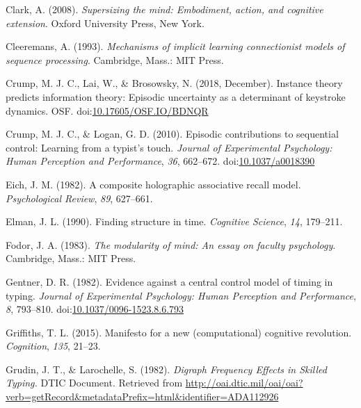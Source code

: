 \documentclass[,man,floatsintext]{apa6}
\begin{document}
\leavevmode\hypertarget{ref-clark_supersizing_2008}{}%
Clark, A. (2008). \emph{Supersizing the mind: Embodiment, action, and cognitive extension}. Oxford University Press, New York.

\leavevmode\hypertarget{ref-cleeremans_mechanisms_1993}{}%
Cleeremans, A. (1993). \emph{Mechanisms of implicit learning connectionist models of sequence processing}. Cambridge, Mass.: MIT Press.

\leavevmode\hypertarget{ref-Crump_Lai_Brosowsky_2018}{}%
Crump, M. J. C., Lai, W., \& Brosowsky, N. (2018, December). Instance theory predicts information theory: Episodic uncertainty as a determinant of keystroke dynamics. OSF. doi:\href{https://doi.org/10.17605/OSF.IO/BDNQR}{10.17605/OSF.IO/BDNQR}

\leavevmode\hypertarget{ref-crump_episodic_2010}{}%
Crump, M. J. C., \& Logan, G. D. (2010). Episodic contributions to sequential control: Learning from a typist's touch. \emph{Journal of Experimental Psychology: Human Perception and Performance}, \emph{36}, 662--672. doi:\href{https://doi.org/10.1037/a0018390}{10.1037/a0018390}

\leavevmode\hypertarget{ref-eich_composite_1982}{}%
Eich, J. M. (1982). A composite holographic associative recall model. \emph{Psychological Review}, \emph{89}, 627--661.

\leavevmode\hypertarget{ref-elman_finding_1990}{}%
Elman, J. L. (1990). Finding structure in time. \emph{Cognitive Science}, \emph{14}, 179--211.

\leavevmode\hypertarget{ref-fodor_modularity_1983}{}%
Fodor, J. A. (1983). \emph{The modularity of mind: An essay on faculty psychology}. Cambridge, Mass.: MIT Press.

\leavevmode\hypertarget{ref-GentnerEvidencecentralcontrol1982}{}%
Gentner, D. R. (1982). Evidence against a central control model of timing in typing. \emph{Journal of Experimental Psychology: Human Perception and Performance}, \emph{8}, 793--810. doi:\href{https://doi.org/10.1037/0096-1523.8.6.793}{10.1037/0096-1523.8.6.793}

\leavevmode\hypertarget{ref-griffiths_manifesto_2015}{}%
Griffiths, T. L. (2015). Manifesto for a new (computational) cognitive revolution. \emph{Cognition}, \emph{135}, 21--23.

\leavevmode\hypertarget{ref-grudin_digraph_1982}{}%
Grudin, J. T., \& Larochelle, S. (1982). \emph{Digraph Frequency Effects in Skilled Typing.} DTIC Document. Retrieved from \url{http://oai.dtic.mil/oai/oai?verb=getRecord\&metadataPrefix=html\&identifier=ADA112926}
\end{document}
